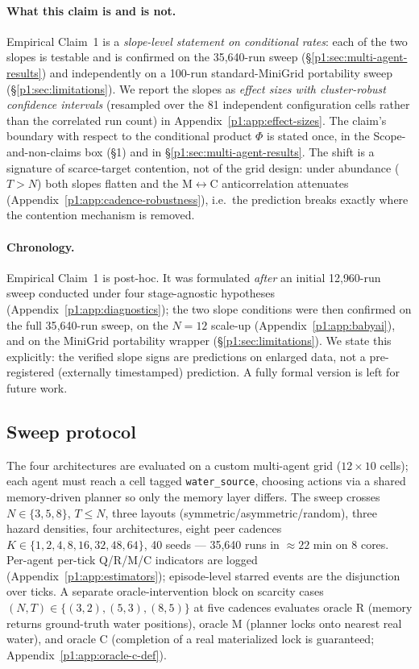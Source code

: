 \documentclass{article}
\begin{document}
\paragraph{What this claim is and is not.}
Empirical Claim~1 is a \emph{slope-level statement on conditional rates}: each of the two slopes is testable and is confirmed on the 35{,}640-run sweep (\S\ref{p1:sec:multi-agent-results}) and independently on a 100-run standard-MiniGrid portability sweep (\S\ref{p1:sec:limitations}). We report the slopes as \emph{effect sizes with cluster-robust confidence intervals} (resampled over the 81 independent configuration cells rather than the correlated run count) in Appendix~\ref{p1:app:effect-sizes}. The claim's boundary with respect to the conditional product $\Phi$ is stated once, in the Scope-and-non-claims box (\S1) and in \S\ref{p1:sec:multi-agent-results}. The shift is a signature of scarce-target contention, not of the grid design: under abundance ($T{>}N$) both slopes flatten and the M$\leftrightarrow$C anticorrelation attenuates (Appendix~\ref{p1:app:cadence-robustness}), i.e.\ the prediction breaks exactly where the contention mechanism is removed.

\paragraph{Chronology.}
Empirical Claim~1 is post-hoc. It was formulated \emph{after} an initial 12{,}960-run sweep conducted under four stage-agnostic hypotheses (Appendix~\ref{p1:app:diagnostics}); the two slope conditions were then confirmed on the full 35{,}640-run sweep, on the $N\!=\!12$ scale-up (Appendix~\ref{p1:app:babyai}), and on the MiniGrid portability wrapper (\S\ref{p1:sec:limitations}). We state this explicitly: the verified slope signs are predictions on enlarged data, not a pre-registered (externally timestamped)
prediction. A fully formal version is left for future work.

\subsection{Sweep protocol}
\label{p1:sec:multi-agent-protocol}

The four architectures are evaluated on a custom multi-agent grid ($12{\times}10$ cells); each agent must reach a cell tagged \texttt{water\_source}, choosing actions via a shared memory-driven planner so only the memory layer differs. The sweep crosses $N{\in}\{3,5,8\}$, $T{\le}N$, three layouts (symmetric/asymmetric/random), three hazard densities, four architectures, eight peer cadences $K{\in}\{1,2,4,8,16,32,48,64\}$, 40 seeds --- 35{,}640 runs in $\approx 22$ min on 8 cores. Per-agent per-tick Q/R/M/C indicators are logged (Appendix~\ref{p1:app:estimators}); episode-level starred events are the disjunction over ticks. A separate oracle-intervention block on scarcity cases $(N,T){\in}\{(3,2),(5,3),(8,5)\}$ at five cadences evaluates oracle R (memory returns ground-truth water positions), oracle M (planner locks onto nearest real water), and oracle C (completion of a real materialized lock is guaranteed; Appendix~\ref{p1:app:oracle-c-def}).
\end{document}
